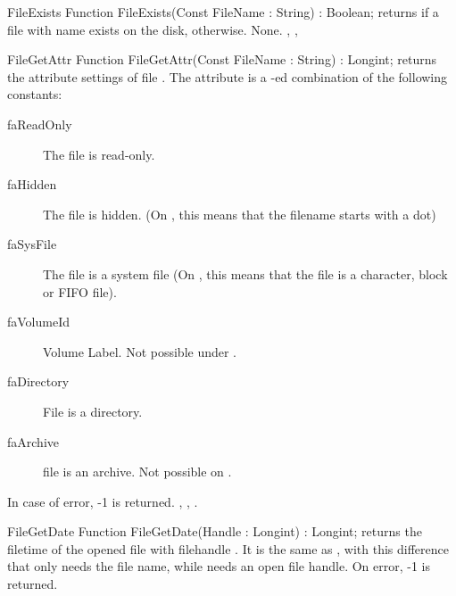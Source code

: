 

\begin{function}{FileExists}
\Declaration
Function FileExists(Const FileName : String) : Boolean;
\Description
{} returns  if a file with name 
exists on the disk,  otherwise.
\Errors
None.
\SeeAlso
{}, , 
\end{function}





\begin{function}{FileGetAttr}
\Declaration
Function FileGetAttr(Const FileName : String) : Longint;
\Description
{} returns the attribute settings of file
. The attribute is a -ed combination
of the following constants:
\begin{description}
\item[faReadOnly] The file is read-only.
\item[faHidden] The file is hidden. (On \linux, this means that the filename
starts with a dot)
\item[faSysFile] The file is a system file (On \linux, this means that the
file is a character, block or FIFO file).
\item[faVolumeId] Volume Label. Not possible under \linux.
\item[faDirectory] File is a directory.
\item[faArchive] file is an archive. Not possible on \linux.
\end{description}
\Errors
In case of error, -1 is returned.
\SeeAlso
{}, , .
\end{function}



\begin{function}{FileGetDate}
\Declaration
Function FileGetDate(Handle : Longint) : Longint;
\Description
{} returns the filetime of the opened file with filehandle
. It is the same as , with this difference that
 only needs the file name, while  needs an
open file handle.
\Errors
On error, -1 is returned.
\SeeAlso
{}
\end{function}



